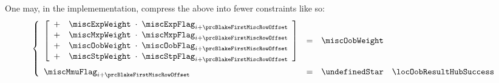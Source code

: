 \begin{description}
\begin{description}
				\saNote{} \label{hub: instruction handling: call: precompiles: blake: generalities: optimized misc flags}
				One may, in the implemementation, compress the above into fewer constraints like so:
				\[
					\left\{ \begin{array}{lcl}
						\left[ \begin{array}{clcl}
							+ & \miscExpWeight & \!\!\! \cdot \!\!\! & \miscExpFlag _{i + \prcBlakeFirstMiscRowOffset} \\
							+ & \miscMxpWeight & \!\!\! \cdot \!\!\! & \miscMxpFlag _{i + \prcBlakeFirstMiscRowOffset} \\
							+ & \miscOobWeight & \!\!\! \cdot \!\!\! & \miscOobFlag _{i + \prcBlakeFirstMiscRowOffset} \\
							+ & \miscStpWeight & \!\!\! \cdot \!\!\! & \miscStpFlag _{i + \prcBlakeFirstMiscRowOffset} \\
						\end{array} \right]
						& = & \miscOobWeight
						\vspace{2mm} \\
						\miscMmuFlag _{i + \prcBlakeFirstMiscRowOffset} & = & \undefinedStar \quad \locOobResultHubSuccess \\
					\end{array} \right.
				\]


\end{description}
\end{description}
